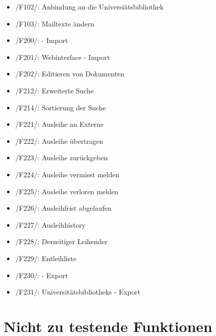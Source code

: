 
\begin{itemize}
\item /F102/: Anbindung an die Universiätsbibliothek
\item /F103/: Mailtexte ändern
\item /F200/: \BibTex - Import %
\item /F201/: Webinterface - Import
\item /F202/: Editieren von Dokumenten
\item /F212/: Erweiterte Suche %
\item /F214/: Sortierung der Suche %
\item /F221/: Ausleihe an Externe %
\item /F222/: Ausleihe übertragen %
\item /F223/: Ausleihe zurückgeben
\item /F224/: Ausleihe vermisst melden
\item /F225/: Ausleihe verloren melden
\item /F226/: Ausleihfrist abgelaufen
\item /F227/: Ausleihhistory
\item /F228/: Derzeitiger Leihender %
\item /F229/: Entleihliste %
\item /F230/: \BibTex - Export %
\item /F231/: Universitätsbibliotheks - Export
\end{itemize}

\section{Nicht zu testende Funktionen}



